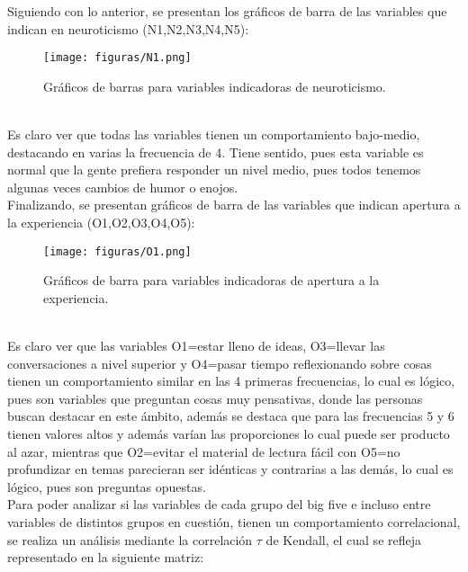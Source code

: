 \documentclass{report}
\begin{document}
Siguiendo con lo anterior, se presentan los gráficos de barra de las variables que indican en neuroticismo (N1,N2,N3,N4,N5):\\

\begin{figure}[htp]
        \centering
    	\texttt{[image: figuras/N1.png]}
    	\caption{Gráficos de barras para variables indicadoras de neuroticismo.}
    	\label{fig: Figura1}
\end{figure}\\

Es claro ver que todas las variables tienen un comportamiento bajo-medio, destacando en varias la frecuencia de 4. Tiene sentido, pues esta variable es normal que la gente prefiera responder un nivel medio, pues todos tenemos algunas veces cambios de humor o enojos. \\

Finalizando, se presentan gráficos de barra de las variables que indican apertura a la experiencia (O1,O2,O3,O4,O5):\\
\vspace{4cm}

\begin{figure}[htp]
        \centering
    	\texttt{[image: figuras/O1.png]}
    	\caption{Gráficos de barra para variables indicadoras de apertura a la experiencia.}
    	\label{fig: Figura1}
\end{figure}\\

Es claro ver que las variables O1=estar lleno de ideas, O3=llevar las conversaciones a nivel superior y O4=pasar tiempo reflexionando sobre cosas tienen un comportamiento similar en las 4 primeras frecuencias, lo cual es lógico, pues son variables que preguntan cosas muy pensativas, donde las personas buscan destacar en este ámbito, además se destaca que para las frecuencias 5 y 6 tienen valores altos y además varían las proporciones lo cual puede ser producto al azar, mientras que O2=evitar el material de lectura fácil con O5=no profundizar en temas parecieran ser idénticas y contrarias a las demás, lo cual es lógico, pues son preguntas opuestas.\\

Para poder analizar si las variables de cada grupo del big five e incluso entre variables de distintos grupos en cuestión, tienen un comportamiento correlacional, se realiza un análisis mediante la correlación $\tau$ de Kendall, el cual se refleja representado en la siguiente matriz:\\
\vspace{7cm}
\end{document}
